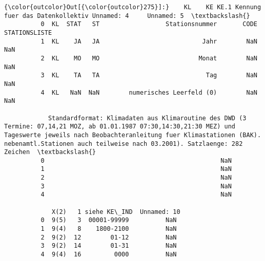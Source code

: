 \documentclass{article}
\begin{document}
            \begin{Verbatim}[commandchars=\\\{\}]
{\color{outcolor}Out[{\color{outcolor}275}]:}    KL    KE KE.1 Kennung fuer das Datenkollektiv Unnamed: 4     Unnamed: 5  \textbackslash{}
          0  KL  STAT   ST                  Stationsnummer       CODE  STATIONSLISTE   
          1  KL    JA   JA                            Jahr        NaN            NaN   
          2  KL    MO   MO                           Monat        NaN            NaN   
          3  KL    TA   TA                             Tag        NaN            NaN   
          4  KL   NaN  NaN        numerisches Leerfeld (0)        NaN            NaN   
          
            Standardformat: Klimadaten aus Klimaroutine des DWD (3 Termine: 07,14,21 MOZ, ab 01.01.1987 07:30,14:30,21:30 MEZ) und Tageswerte jeweils nach Beobachteranleitung fuer Klimastationen (BAK). nebenamtl.Stationen auch teilweise nach 03.2001). Satzlaenge: 282 Zeichen  \textbackslash{}
          0                                                NaN                                                                                                                                                                                                                        
          1                                                NaN                                                                                                                                                                                                                        
          2                                                NaN                                                                                                                                                                                                                        
          3                                                NaN                                                                                                                                                                                                                        
          4                                                NaN                                                                                                                                                                                                                        
          
             X(2)   1 siehe KE\_IND  Unnamed: 10  
          0  9(5)   3  00001-99999          NaN  
          1  9(4)   8    1800-2100          NaN  
          2  9(2)  12        01-12          NaN  
          3  9(2)  14        01-31          NaN  
          4  9(4)  16         0000          NaN  
\end{Verbatim}
        
\end{document}
